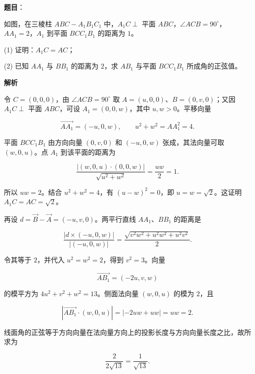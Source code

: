 \begin{answer}

\textbf{题目}：

如图，在三棱柱 $ABC-A_1B_1C_1$ 中，$A_1C\perp$ 平面 $ABC$，$\angle ACB=90^\circ$，$AA_1=2$，$A_1$ 到平面 $BCC_1B_1$ 的距离为 $1$。
\nopagebreak[4]
\begin{center}\end{center}
\nopagebreak[4]
  (1) 证明：$A_1C=AC$；

  (2) 已知 $AA_1$ 与 $BB_1$ 的距离为 $2$，求 $AB_1$ 与平面 $BCC_1B_1$ 所成角的正弦值。

\textbf{解析}


令 $C=(0,0,0)$，由 $\angle ACB=90^\circ$ 取 $A=(u,0,0)$、$B=(0,v,0)$；又因 $A_1C\perp$ 平面 $ABC$，可设 $A_1=(0,0,w)$，其中 $u,w>0$。平移向量

\nopagebreak[4]
\[
\overrightarrow{AA_1}=(-u,0,w),\qquad u^2+w^2=AA_1^2=4.
\]

平面 $BCC_1B_1$ 由方向向量 $(0,v,0)$ 和 $(-u,0,w)$ 张成，其法向量可取 $(w,0,u)$。点 $A_1$ 到该平面的距离为

\nopagebreak[4]
\[
\frac{|(w,0,u)\cdot(0,0,w)|}{\sqrt{u^2+w^2}}
=\frac{uw}{2}=1.
\]

所以 $uw=2$。结合 $u^2+w^2=4$，有 $(u-w)^2=0$，即 $u=w=\sqrt2$。这证明 $A_1C=AC=\sqrt2$。


再设 $d=\overrightarrow{B}-\overrightarrow{A}=(-u,v,0)$。两平行直线 $AA_1$、$BB_1$ 的距离是

\nopagebreak[4]
\[
\frac{|d\times(-u,0,w)|}{|(-u,0,w)|}
=\frac{\sqrt{v^2w^2+u^2w^2+u^2v^2}}2.
\]

令其等于 $2$，并代入 $u^2=w^2=2$，得到 $v^2=3$。向量

\nopagebreak[4]
\[
\overrightarrow{AB_1}=(-2u,v,w)
\]

的模平方为 $4u^2+v^2+w^2=13$。侧面法向量 $(w,0,u)$ 的模为 $2$，且

\nopagebreak[4]
\[
|\overrightarrow{AB_1}\cdot(w,0,u)|
=|-2uw+uw|=uw=2.
\]

线面角的正弦等于方向向量在法向量方向上的投影长度与方向向量长度之比，故所求为

\nopagebreak[4]
\[
\frac{2}{2\sqrt{13}}=\frac1{\sqrt{13}}.
\]



\end{answer}
